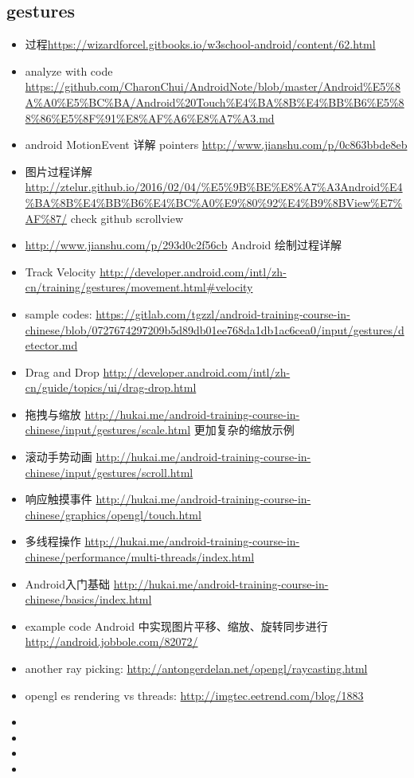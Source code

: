 \documentclass[9pt,b5paper]{article}
\begin{document}
\subsection{gestures}
\label{sec-2-2}
\begin{itemize}
\item 过程\url{https://wizardforcel.gitbooks.io/w3school-android/content/62.html}
\item analyze with code \url{https://github.com/CharonChui/AndroidNote/blob/master/Android\%E5\%8A\%A0\%E5\%BC\%BA/Android\%20Touch\%E4\%BA\%8B\%E4\%BB\%B6\%E5\%88\%86\%E5\%8F\%91\%E8\%AF\%A6\%E8\%A7\%A3.md}
\item android MotionEvent 详解 pointers \url{http://www.jianshu.com/p/0c863bbde8eb}
\item 图片过程详解\url{http://ztelur.github.io/2016/02/04/\%E5\%9B\%BE\%E8\%A7\%A3Android\%E4\%BA\%8B\%E4\%BB\%B6\%E4\%BC\%A0\%E9\%80\%92\%E4\%B9\%8BView\%E7\%AF\%87/} check github scrollview
\item \url{http://www.jianshu.com/p/293d0c2f56cb} Android 绘制过程详解
\item Track Velocity \url{http://developer.android.com/intl/zh-cn/training/gestures/movement.html#velocity}
\item sample codes: \url{https://gitlab.com/tgzzl/android-training-course-in-chinese/blob/0727674297209b5d89db01ee768da1db1ac6cea0/input/gestures/detector.md}
\item Drag and Drop \url{http://developer.android.com/intl/zh-cn/guide/topics/ui/drag-drop.html}
\item 拖拽与缩放 \url{http://hukai.me/android-training-course-in-chinese/input/gestures/scale.html} 更加复杂的缩放示例
\item 滚动手势动画 \url{http://hukai.me/android-training-course-in-chinese/input/gestures/scroll.html}
\item 响应触摸事件 \url{http://hukai.me/android-training-course-in-chinese/graphics/opengl/touch.html}
\item 多线程操作 \url{http://hukai.me/android-training-course-in-chinese/performance/multi-threads/index.html}
\item Android入门基础 \url{http://hukai.me/android-training-course-in-chinese/basics/index.html}
\item example code Android 中实现图片平移、缩放、旋转同步进行 \url{http://android.jobbole.com/82072/}
\item another ray picking: \url{http://antongerdelan.net/opengl/raycasting.html}
\item opengl es rendering vs threads: \url{http://imgtec.eetrend.com/blog/1883}
\item 
\item 
\item 
\item 
\end{itemize}
\end{document}

